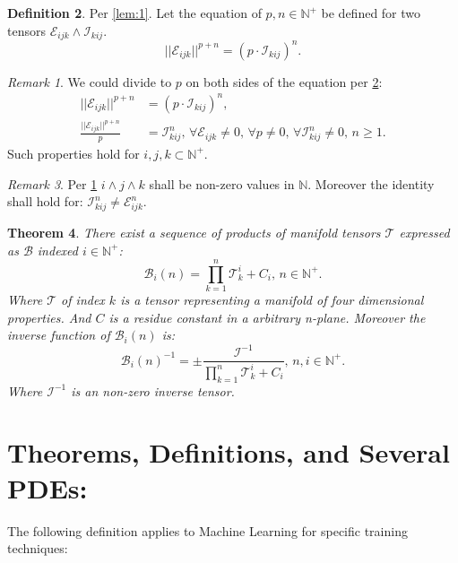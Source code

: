 \documentclass[10pt]{article}
\theoremstyle{plain}
\newtheorem{theorem}{Theorem}[section]
\theoremstyle{definition}
\newtheorem{definition}[theorem]{Definition}
\theoremstyle{remark}
\newtheorem{remark}[theorem]{Remark}
\begin{document}
\begin{definition}
\label{def:1}
Per \ref{lem:1}. Let the equation of $p, n \in \mathbb{N}^{+}$ be defined for two tensors $\mathcal{E}_{ijk} \land \mathcal{I}_{kij}$.
\begin{equation}
	||\mathcal{E}_{ijk}||^{p+n} = (p \cdot \mathcal{I}_{kij})^{n}.
\end{equation}
\begin{remark}
\label{rem:1}
We could divide to $p$ on both sides of the equation per \ref{def:1}:
\begin{align*}
	||\mathcal{E}_{ijk}||^{p+n} &= (p \cdot \mathcal{I}_{kij})^{n},\\
	\frac{||\mathcal{E}_{ijk}||^{p+n}}{p} &= \mathcal{I}_{kij}^{n}, \, \forall \mathcal{E}_{ijk} \neq 0, \, \forall p \neq 0, \, \forall \mathcal{I}_{kij}^n \neq 0, \, n \geq 1.
\end{align*}
Such properties hold for $i, j, k \subset \mathbb{N}^{+}$.
\end{remark}
\end{definition}
\begin{remark}
	Per \ref{rem:1} $i \land j \land k$ shall be non-zero values in $\mathbb{N}$. Moreover the identity shall hold for: $\mathcal{I}_{kij}^{n} \neq \mathcal{E}_{ijk}^{n}$.
\end{remark}

\begin{theorem}
There exist a sequence of products of manifold tensors $\mathcal{T}$ expressed as $\mathcal{B}$ indexed $i \in \mathbb{N}^{+}$:
\begin{equation}
	\mathcal{B}_{i}(n) = \prod_{k=1}^{n} \mathcal{T}_{k}^{i} + C_{i}, \, n \in \mathbb{N}^{+}.
\end{equation}
Where $\mathcal{T}$ of index $k$ is a tensor representing a manifold of four dimensional properties. And $C$ is a residue constant in a arbitrary n-plane. Moreover the inverse function of $\mathcal{B}_{i}(n)$ is:
\begin{equation}
	\mathcal{B}_{i}(n)^{-1} = \pm \frac{\mathcal{I}^{-1}}{\prod_{k=1}^{n} \mathcal{T}_{k}^{i} + C_{i}}, \, n, i \in \mathbb{N}^{+}.
\end{equation}
Where $\mathcal{I}^{-1}$ is an non-zero inverse tensor.
\end{theorem}

\section{Theorems, Definitions, and Several PDEs:}
The following definition applies to Machine Learning for specific training techniques:
\end{document}
